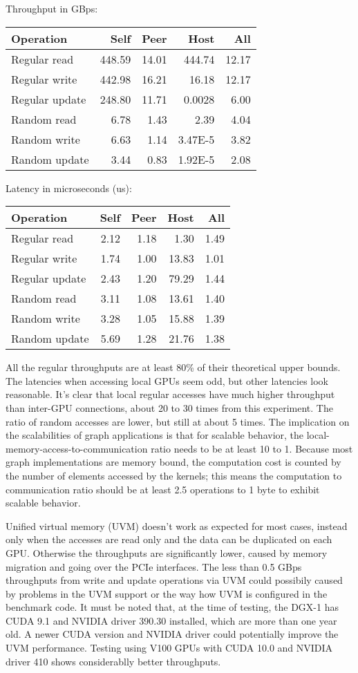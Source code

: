 \documentclass[10pt,oneside]{memoir}
\begin{document}
Throughput in GBps:

\begin{longtable}[]{@{}lrrrr@{}}
\toprule
Operation & Self & Peer & Host & All\tabularnewline
\midrule
\endhead
Regular read & 448.59 & 14.01 & 444.74 & 12.17\tabularnewline
Regular write & 442.98 & 16.21 & 16.18 & 12.17\tabularnewline
Regular update & 248.80 & 11.71 & 0.0028 & 6.00\tabularnewline
Random read & 6.78 & 1.43 & 2.39 & 4.04\tabularnewline
Random write & 6.63 & 1.14 & 3.47E-5 & 3.82\tabularnewline
Random update & 3.44 & 0.83 & 1.92E-5 & 2.08\tabularnewline
\bottomrule
\end{longtable}

Latency in microseconds (us):

\begin{longtable}[]{@{}lrrrr@{}}
\toprule
Operation & Self & Peer & Host & All\tabularnewline
\midrule
\endhead
Regular read & 2.12 & 1.18 & 1.30 & 1.49\tabularnewline
Regular write & 1.74 & 1.00 & 13.83 & 1.01\tabularnewline
Regular update & 2.43 & 1.20 & 79.29 & 1.44\tabularnewline
Random read & 3.11 & 1.08 & 13.61 & 1.40\tabularnewline
Random write & 3.28 & 1.05 & 15.88 & 1.39\tabularnewline
Random update & 5.69 & 1.28 & 21.76 & 1.38\tabularnewline
\bottomrule
\end{longtable}

All the regular throughputs are at least 80\% of their theoretical upper
bounds. The latencies when accessing local GPUs seem odd, but other
latencies look reasonable. It's clear that local regular accesses have
much higher throughput than inter-GPU connections, about 20 to 30 times
from this experiment. The ratio of random accesses are lower, but still
at about 5 times. The implication on the scalabilities of graph
applications is that for scalable behavior, the
local-memory-access-to-communication ratio needs to be at least 10 to 1.
Because most graph implementations are memory bound, the computation
cost is counted by the number of elements accessed by the kernels; this
means the computation to communication ratio should be at least 2.5
operations to 1 byte to exhibit scalable behavior.

Unified virtual memory (UVM) doesn't work as expected for most cases,
instead only when the accesses are read only and the data can be
duplicated on each GPU. Otherwise the throughputs are significantly
lower, caused by memory migration and going over the PCIe interfaces.
The less than 0.5 GBps throughputs from write and update operations via
UVM could possibily caused by problems in the UVM support or the way how
UVM is configured in the benchmark code. It must be noted that, at the
time of testing, the DGX-1 has CUDA 9.1 and NVIDIA driver 390.30
installed, which are more than one year old. A newer CUDA version and
NVIDIA driver could potentially improve the UVM performance. Testing
using V100 GPUs with CUDA 10.0 and NVIDIA driver 410 shows considerablly
better throughputs.
\end{document}
